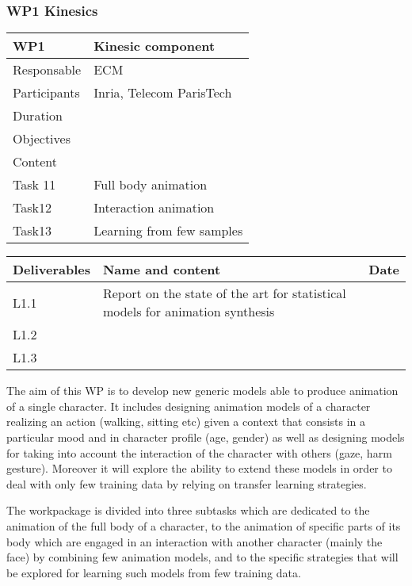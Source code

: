 

\subsubsection{WP1 Kinesics}


\begin{center}
\begin{tabular}{|l|l|}\hline
WP1 &  Kinesic component \\\hline
Responsable &  ECM  \\\hline
Participants &  Inria, Telecom ParisTech\\\hline
Duration  &   \\\hline
Objectives &   \\\hline
Content &  \\\hline
Task 11 & Full body animation  \\\hline
Task12 &  Interaction animation \\\hline
Task13 &  Learning from few samples  \\\hline
\end{tabular}
\begin{tabular}{|l|l|l|}\hline
Deliverables & Name and content  & Date  \\\hline
L1.1  & Report on the state of the art for statistical models for animation synthesis & \\\hline
L1.2  &  & \\\hline
L1.3  &  & \\\hline
\end{tabular}
\end{center}



The aim of this WP is to develop new generic models able to produce animation of a single character. It includes designing animation models of a character realizing an action (walking, sitting etc) given a context that consists in a particular mood and in character profile (age, gender) as well as designing models for taking into account the interaction of the character with others (gaze, harm gesture). Moreover it will explore the ability to extend these models in order to deal with only few training data by relying on transfer learning strategies.

The workpackage is divided into three subtasks which are dedicated to the animation of the full body of a character, to the animation of specific parts of its body which are engaged in an interaction with another character (mainly the face) by combining few animation models, and to the specific strategies that will be explored for learning such models from few training data.

